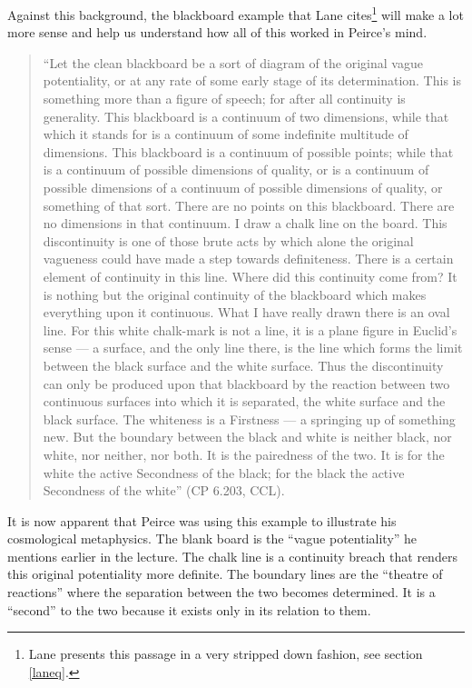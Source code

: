 Against this background, the blackboard example that Lane cites\footnote{Lane presents this passage in a very stripped down fashion, see section \ref{laneq}.} will make a lot more sense and help us understand how all of this worked in Peirce's mind.
\begin{quotation}
\noindent``Let the clean blackboard be a sort of diagram of the original vague potentiality, or at any rate of some early stage of its determination. This is something more than a figure of speech; for after all continuity is generality. This blackboard is a continuum of two dimensions, while that which it stands for is a continuum of some indefinite multitude of dimensions. This blackboard is a continuum of possible points; while that is a continuum of possible dimensions of quality, or is a continuum of possible dimensions of a continuum of possible dimensions of quality, or something of that sort. There are no points on this blackboard. There are no dimensions in that continuum. I draw a chalk line on the board. This discontinuity is one of those brute acts by which alone the original vagueness could have made a step towards definiteness. There is a certain element of continuity in this line. Where did this continuity come from? It is nothing but the original continuity of the blackboard which makes everything upon it continuous. What I have really drawn there is an oval line. For this white chalk-mark is not a line, it is a plane figure in Euclid's sense — a surface, and the only line there, is the line which forms the limit between the black surface and the white surface. Thus the discontinuity can only be produced upon that blackboard by the reaction between two continuous surfaces into which it is separated, the white surface and the black surface. The whiteness is a Firstness — a springing up of something new. But the boundary between the black and white is neither black, nor white, nor neither, nor both. It is the pairedness of the two. It is for the white the active Secondness of the black; for the black the active Secondness of the white'' (CP 6.203, CCL).
\end{quotation}
It is now apparent that Peirce was using this example to illustrate his cosmological metaphysics. The blank board is the ``vague potentiality'' he mentions earlier in the lecture. The chalk line is a continuity breach that renders this original potentiality more definite. The boundary lines are the ``theatre of reactions'' where the separation between the two becomes determined. It is a ``second'' to the two because it exists only in its relation to them.

